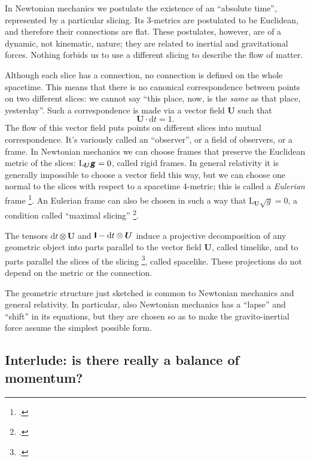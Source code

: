 \documentclass[\ifafour a4paper,12pt,\else a5paper,10pt,\fi%
onecolumn,oneside,article,%
british%
]{memoir}
\theoremstyle{remark}
\theoremstyle{innote}
\newcommand*{\mathte}[1]{\textbf{\textit{\textsf{#1}}}}
\newcommand*{\citep}{\footcites}%
\newcommand*{\di}{\mathrm{d}}%
\renewcommand*{\|}{\nonscript\,\vert\nonscript\;\mathopen{}}
\newcommand*{\sect}{\S}%
\newcommand*{\Li}{\mathrm{L}}
\newcommand*{\yrr}{M}
\newcommand*{\yr}{\bm{\yrr}}
\newcommand*{\ycc}{u}
\newcommand*{\yc}{\bm{\ycc}}
\newcommand*{\yFF}{U}
\newcommand*{\yF}{\bm{\yFF}}
\newcommand*{\ygg}{g}
\newcommand*{\yg}{\mathte{\ygg}}
\newcommand*{\ygv}{\sqrt{\ygg}}
\newcommand*{\yI}{\textsf{\textbf{I}}}
\begin{document}
In Newtonian mechanics we postulate the existence of an \enquote{absolute
  time}, represented by a particular slicing. Its 3-metrics are
postulated to be Euclidean, and therefore their connections are flat. These
postulates, however, are of a dynamic, not kinematic, nature; they are
related to inertial and gravitational forces. Nothing forbids us to use a
different slicing to describe the flow of matter.

Although each slice has a connection, no connection is defined on the whole
spacetime. This means that there is no canonical correspondence between
points on two different slices: we cannot say \enquote{this place, now, is
  the \emph{same} as that place, yesterday}. Such a correspondence is made
via a vector field $\yF$ such that
\begin{equation}
  \label{eq:observer_field_unit-time}
  \yF \cdot \di t = 1.
\end{equation}
The flow of this vector field puts points on different slices into mutual
correspondence. It's variously called an \enquote{observer}, or a field of
observers, or a frame. In Newtonian mechanics we can choose frames that
preserve the Euclidean metric of the slices: $\Li_{\yF}\yg = 0$, called
rigid frames. In general relativity it is generally impossible to choose a
vector field this way, but we can choose one normal to the slices with
respect to a spacetime 4-metric; this is called a \emph{Eulerian} frame
\citep{smarretal1978,smarretal1980}. An Eulerian frame can also be chosen in
such a way that $\Li_{\yF}\ygv=0$, a condition called \enquote{maximal
  slicing} \citep[\sect~III.B]{smarretal1978}.

The tensors $\di t\otimes\yF$ and $\yI-\di t\otimes\yF$ induce a projective
decomposition of any geometric object into parts parallel to the vector
field $\yF$, called timelike, and to parts parallel the slices of the
slicing \citep[\sect~B.1.4]{hehletal2003}, called spacelike. These
projections do not depend on the metric or the connection.

The geometric structure just sketched is common to Newtonian mechanics and
general relativity. In particular, also Newtonian mechanics has a
\enquote{lapse} and \enquote{shift} in its equations, but they are chosen
so as to make the gravito-inertial force assume the simplest possible form.

\iffalse
\subsection{Interlude: is there really a balance of momentum?}
\label{sec:really_balance_momentum}
\end{document}
